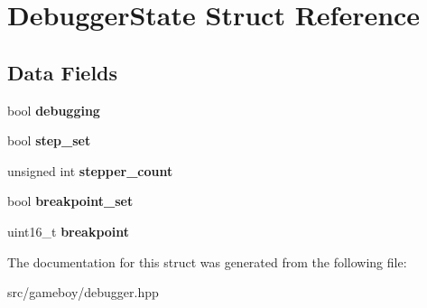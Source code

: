 \hypertarget{structDebuggerState}{}\section{Debugger\+State Struct Reference}
\label{structDebuggerState}
\subsection*{Data Fields}
\begin{DoxyCompactItemize}
\item 
\mbox{\label{structDebuggerState_a20cdc00f0d9054c48f13fb0312df8884}} 
bool {\bfseries debugging}
\item 
\mbox{\label{structDebuggerState_a6639effd05e4732748f00d028147b78f}} 
bool {\bfseries step\+\_\+set}
\item 
\mbox{\label{structDebuggerState_a382993246ed27b0778d3069af4868aa5}} 
unsigned int {\bfseries stepper\+\_\+count}
\item 
\mbox{\label{structDebuggerState_a4eeabf35f3cb6144f156a477402b3c5e}} 
bool {\bfseries breakpoint\+\_\+set}
\item 
\mbox{\label{structDebuggerState_a529202548c7619bed9e4e5bd32bb5ce8}} 
uint16\+\_\+t {\bfseries breakpoint}
\end{DoxyCompactItemize}


The documentation for this struct was generated from the following file\+:\begin{DoxyCompactItemize}
\item 
src/gameboy/debugger.\+hpp\end{DoxyCompactItemize}
